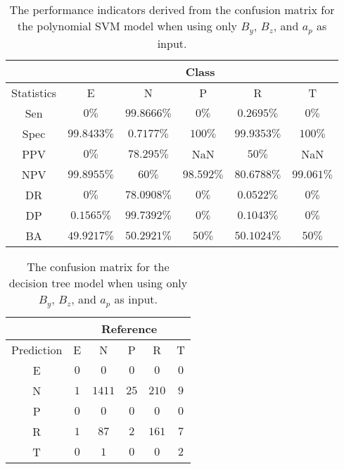 \begin{table}[!ht]
	\centering
	\begin{tabular}{|c|c|c|c|c|c|}
		\hline
		 & \multicolumn{5}{c|}{Class} \\ \hline
		Statistics & E & N & P & R & T \\ \hline
		Sen & $0\%$ & $99.8666\%$ & $0\%$ & $0.2695\%$ & $0\%$ \\ \hline
		Spec & $99.8433\%$ & $0.7177\%$ & $100\%$ & $99.9353\%$ & $100\%$ \\ \hline
		PPV & $0\%$ & $78.295\%$ & NaN & $50\%$ & NaN \\ \hline
		NPV & $99.8955\%$ & $60\%$ & $98.592\%$ & $80.6788\%$ & $99.061\%$ \\ \hline
		DR & $0\%$ & $78.0908\%$ & $0\%$ & $0.0522\%$ & $0\%$ \\ \hline
		DP & $0.1565\%$ & $99.7392\%$ & $0\%$ & $0.1043\%$ & $0\%$ \\ \hline
		BA & $49.9217\%$ & $50.2921\%$ & $50\%$ & $50.1024\%$ & $50\%$ \\ \hline
	\end{tabular}
	\caption{The performance indicators derived from the confusion matrix for the polynomial SVM model when using only $B_{y}$, $B_{z}$, and $a_{p}$ as input.}
	\label{tab:cs:reverse:yzap:svmPoly}
\end{table}

\begin{table}[!ht]
	\centering
	\begin{tabular}{|c|c|c|c|c|c|}
		\hline
		 & \multicolumn{5}{|c|}{Reference} \\ \hline
		 Prediction & E & N & P & R & T \\ \hline
		 E & $0$ & $0$ & $0$ & $0$ & $0$ \\ \hline
		 N & $1$ & $1411$ & $25$ & $210$ & $9$ \\ \hline
		 P & $0$ & $0$ & $0$ & $0$ & $0$ \\ \hline
		 R & $1$ & $87$ & $2$ & $161$ & $7$ \\ \hline
		 T & $0$ & $1$ & $0$ & $0$ & $2$ \\ \hline
	\end{tabular}
	\caption{The confusion matrix for the decision tree model when using only $B_{y}$, $B_{z}$, and $a_{p}$ as input.}
	\label{tab:cm:yzap:C5.0}
\end{table}

